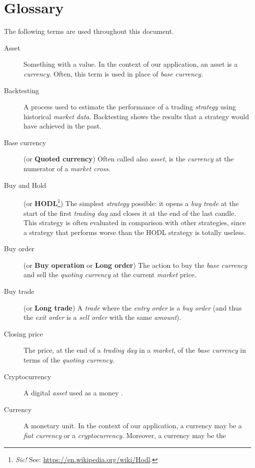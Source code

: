 \chapter{Glossary}\label{appendix:glossary}

The following terms are used throughout this document.

\begin{description}
	\item[Asset] Something with a value. In the context of our application,
		an asset is a \textit{currency}. Often, this term is used in
		place of \textit{base currency}.
	\item[Backtesting] A process used to estimate the performance of a
		trading \textit{strategy} using historical \textit{market data}.
		Backtesting shows the results that a strategy would have
		achieved in the past.
	\item[Base currency] (or \textbf{Quoted currency}) Often called also
		\textit{asset}, is the \textit{currency} at the numerator of a
		\textit{market cross}.
	\item[Buy and Hold] (or \textbf{HODL}\footnote{\textit{Sic!} See:
		\url{https://en.wikipedia.org/wiki/Hodl}.}) The simplest
		\textit{strategy} possible: it opens a \textit{buy trade} at the
		start of the first \textit{trading day} and closes it at the end
		of the last candle. This strategy is often evaluated in
		comparison with other strategies, since a strategy that performs
		worse than the HODL strategy is totally useless.
	\item[Buy order] (or \textbf{Buy operation} or \textbf{Long order}) The
		action to buy the \textit{base currency} and sell the
		\textit{quoting currency} at the current \textit{market} price.
	\item[Buy trade] (or \textbf{Long trade}) A \textit{trade} where the
		\textit{entry order} is a \textit{buy order} (and thus the
		\textit{exit order} is a \textit{sell order} with the same
		\textit{amount}).
	\item[Closing price] The price, at the end of a \textit{trading
		day} in a \textit{market}, of the \textit{base currency} in
		terms of the \textit{quoting currency}.
	\item[Cryptocurrency] A digital \textit{asset} used as a money
		.
	\item[Currency] A monetary unit. In the context of our application, a
		currency may be a \textit{fiat currency} or a
		\textit{cryptocurrency}. Moreover, a currency may be the

\end{description}
